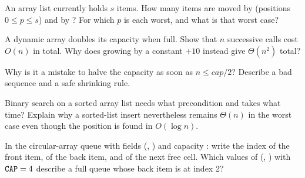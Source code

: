 \begin{questions}
\item An array list currently holds $s$ items. How many items are moved by
   (positions $0\le p\le s$) and by ? For which $p$ is each
  worst, and what is that worst case?
\item A dynamic array doubles its capacity when full. Show that $n$ successive
   calls cost $O(n)$ in total. Why does growing by a constant $+10$ instead
  give $\Theta(n^2)$ total?
\item Why is it a mistake to halve the capacity as soon as $n\le\mathit{cap}/2$? Describe
  a bad sequence and a safe shrinking rule.
\item Binary search on a sorted array list needs what precondition and takes what time?
  Explain why a sorted-list insert nevertheless remains $\Theta(n)$ in the worst case
  even though the position is found in $O(\log n)$.
\item In the circular-array queue with fields (, ) and capacity
  : write the index of the front item, of the back item, and of the next free
  cell. Which values of (, ) with $\texttt{CAP}=4$ describe a full queue
  whose back item is at index 2?
\end{questions}

